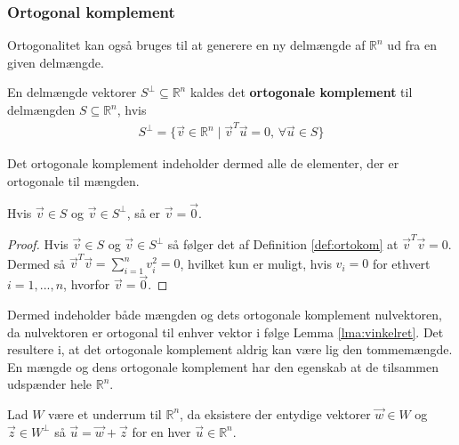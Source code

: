 \subsubsection{Ortogonal komplement}
Ortogonalitet kan også bruges til at generere en ny delmængde af $\mathds{R}^n$ ud fra en given delmængde.
\begin{defn}
En delmængde vektorer $S^{\bot} \subseteq \mathds{R}^n$ kaldes det \textbf{ortogonale komplement} til delmængden $S \subseteq \mathds{R}^n$, hvis 
\begin{align*}
	S^{\bot} = \{\vec{v} \in \mathds{R}^n \mid \vec{v}^T\vec{u} = 0, \, \forall \vec{u} \in S\}
\end{align*}
\label{def:ortokom}
\end{defn}
Det ortogonale komplement indeholder dermed alle de elementer, der er ortogonale til mængden.
\begin{prop}
Hvis $\vec{v} \in S$ og $\vec{v} \in S^{\bot}$, så er  $\vec{v}=\vec{0}$.
\label{prop:nulortokomp}
\end{prop}
\begin{proof}
Hvis $\vec{v} \in S$ og $\vec{v} \in S^{\bot}$ så følger det af Definition \ref{def:ortokom} at $\vec{v}^T\vec{v} = 0$.
Dermed så $\vec{v}^T\vec{v} = \sum_{i=1}^n v_i^2 =0$, hvilket kun er muligt, hvis $v_i = 0$ for ethvert $i = 1,..., n$, hvorfor $\vec{v}=\vec{0}$.
\end{proof}
Dermed indeholder både mængden og dets ortogonale komplement nulvektoren, da nulvektoren er ortogonal til enhver vektor i følge Lemma \ref{lma:vinkelret}. 
Det resultere i, at det ortogonale komplement aldrig kan være lig den tommemængde.
En mængde og dens ortogonale komplement har den egenskab at de tilsammen udspænder hele $\mathds{R}^n$.
\begin{stn}
Lad $W$ være et underrum til $\mathds{R}^n$, da eksistere der entydige vektorer  $\vec{w} \in W$ og $\vec{z} \in W^{\bot}$ så $\vec{u}= \vec{w}+\vec{z}$ for en hver $\vec{u} \in \mathds{R}^n$.
\label{stn:Rnorto}
\end{stn}
